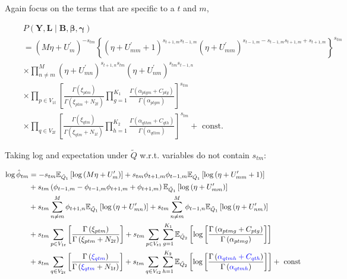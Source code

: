 \documentclass{article}
\begin{document}
Again focus on the terms that are specific to a $t$ and $m$,


\begin{align*}
&P(\mathbf{Y}, \mathbf{L} \mid \mathbf{B}, \boldsymbol{\beta}, \boldsymbol{\gamma})
\\\quad &=\left(M \eta+U_{m}^{\prime}\right)^{-s_{t m}}\left\{\left(\eta+U_{m m}^{\prime}+1\right)^{s_{t+1, m} s_{t-1, m}}\left(\eta+U_{m m}^{\prime}\right)^{s_{t-1, m}-s_{t-1, m} s_{t+1, m}+s_{t+1, m}}\right\}^{s_{t m}} \\
\quad &\times \prod_{n \neq m}^{M}\left(\eta+U_{m n}^{\prime}\right)^{s_{t+1, n} s_{t m}}\left(\eta+U_{n m}^{\prime}\right)^{s_{t m} s_{t-1, n}} \\ 
& \times \prod_{p \in V_{1t}} \left[ \frac{\Gamma\left(\xi_{ptm}\right)}{\Gamma \left( \xi_{ptm} + N_{2t} \right)}\prod_{g=1}^{K_1}\frac{ \Gamma\left( \alpha_{ptgm} + C_{ptg} \right)}{\Gamma\left(\alpha_{ptgm}\right)}  \right]^{s_{tm}} \\
&\times \prod_{q \in V_{2t}}  \left[ \frac{\Gamma\left(\xi_{qtm}\right)}{\Gamma \left( \xi_{qtm} + N_{1t} \right)}\prod_{h=1}^{K_2}\frac{ \Gamma\left( \alpha_{qthm} + C_{qth} \right)}{\Gamma\left(\alpha_{qthm}\right)}  \right]^{s_{tm}}  + \text { const. } 
\end{align*}

Taking log and expectation under $\tilde{Q}$ w.r.t. variables do not contain $s_{tm}$:

\begin{equation*}
\begin{aligned} \log \hat{\phi}_{t m} &=-s_{t m} \mathbb{E}_{\tilde{Q}_{1}}\left[\log \left(M \eta+U_{m}^{\prime}\right)\right]+s_{t m} \phi_{t+1, m} \phi_{t-1, m} \mathbb{E}_{\tilde{Q}_{1}}\left[\log \left(\eta+U_{m m}^{\prime}+1\right)\right] \\ 
&+s_{t m}\left(\phi_{t-1, m}-\phi_{t-1, m} \phi_{t+1, m}+\phi_{t+1, m}\right) \mathbb{E}_{\tilde{Q}_{1}}\left[\log \left(\eta+U_{m m}^{\prime}\right)\right] \\ 
&+s_{t m} \sum_{n \neq m}^{M} \phi_{t+1, n} \mathbb{E}_{\tilde{Q}_{1}}\left[\log \left(\eta+U_{m n}^{\prime}\right)\right] + s_{t m} \sum_{n \neq m}^{M} \phi_{t-1, n} \mathbb{E}_{\tilde{Q}_{1}}\left[\log \left(\eta+U_{n m}^{\prime}\right)\right] \\
&+s_{t m} \sum_{p \in V_{1t}}\left[\frac{\Gamma\left(\xi_{p t m}\right)}{\Gamma\left(\xi_{p t m}+ N_{2t}\right)}\right] + s_{t m} \sum_{p \in V_{t1}} \sum_{g=1}^{K_1} \mathbb{E}_{\tilde{Q}_2}\left[\log \left[\frac{\Gamma\left(\alpha_{p t m g}+C_{p t g}\right)}{\Gamma\left(\alpha_{p t m g}\right)}\right]\right] \\
&+s_{t m} \sum_{q \in V_{2t}}\left[\frac{\Gamma\left(\textcolor{blue}{\xi_{q t m}}\right)}{\Gamma\left(\textcolor{blue}{\xi_{q t m}}+ N_{1t}\right)}\right] + s_{t m} \sum_{q \in V_{t2}} \sum_{h=1}^{K_2} \mathbb{E}_{\tilde{Q}_2}\left[\log \left[\frac{\Gamma\left(\textcolor{blue}{\alpha_{q t m h}+C_{q t h}}\right)}{\Gamma\left(\textcolor{blue}{\alpha_{q t m h}}\right)}\right]\right] +\text { const } \end{aligned}
\end{equation*}
\end{document}
